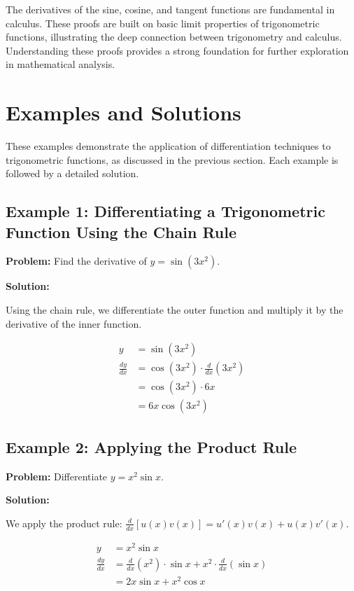 \documentclass[a4paper,12pt]{book}
\newcounter{example}
\begin{document}
The derivatives of the sine, cosine, and tangent functions are fundamental in calculus. These proofs are built on basic limit properties of trigonometric functions, illustrating the deep connection between trigonometry and calculus. Understanding these proofs provides a strong foundation for further exploration in mathematical analysis.

\section*{Examples and Solutions}

These examples demonstrate the application of differentiation techniques to trigonometric functions, as discussed in the previous section. Each example is followed by a detailed solution.

\subsection*{Example 1: Differentiating a Trigonometric Function Using the Chain Rule}

\textbf{Problem:} Find the derivative of \( y = \sin(3x^2) \).

\textbf{Solution:}

Using the chain rule, we differentiate the outer function and multiply it by the derivative of the inner function.

\begin{align*}
y &= \sin(3x^2) \\
\frac{dy}{dx} &= \cos(3x^2) \cdot \frac{d}{dx}(3x^2) \\
              &= \cos(3x^2) \cdot 6x \\
              &= 6x \cos(3x^2)
\end{align*}

\subsection*{Example 2: Applying the Product Rule}

\textbf{Problem:} Differentiate \( y = x^2 \sin x \).

\textbf{Solution:}

We apply the product rule: \(\frac{d}{dx}[u(x)v(x)] = u'(x)v(x) + u(x)v'(x)\).

\begin{align*}
y &= x^2 \sin x \\
\frac{dy}{dx} &= \frac{d}{dx}(x^2) \cdot \sin x + x^2 \cdot \frac{d}{dx}(\sin x) \\
              &= 2x \sin x + x^2 \cos x
\end{align*}
\end{document}
